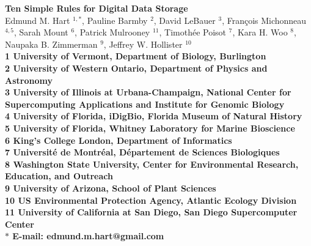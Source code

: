 \documentclass[10pt,letterpaper]{article}
\date{}
\begin{document}
\vspace*{0.35in}


\begin{flushleft}
{\Large
\textbf{Ten Simple Rules for Digital Data Storage}
}
\newline
\\
Edmund M. Hart $^{1 ,\ast}$,
Pauline Barmby $^{2 }$,
David LeBauer $^{3 }$,
François Michonneau $^{4,5 }$,
Sarah Mount $^{6 }$,
Patrick Mulrooney $^{11 }$,
Timothée Poisot $^{7 }$,
Kara H. Woo $^{8 }$,
Naupaka B. Zimmerman $^{9 }$,
Jeffrey W. Hollister $^{10 }$\\
\bigskip
\bf{1} University of Vermont, Department of Biology, Burlington
\\
\bf{2} University of Western Ontario, Department of Physics and Astronomy
\\
\bf{3} University of Illinois at Urbana-Champaign, National Center for Supercomputing Applications and Institute for
Genomic Biology
\\
\bf{4} University of Florida, iDigBio, Florida Museum of Natural History
\\
\bf{5} University of Florida, Whitney Laboratory for Marine Bioscience
\\
\bf{6} King's College London, Department of Informatics
\\
\bf{7} Université de Montréal, Département de Sciences Biologiques
\\
\bf{8} Washington State University, Center for Environmental Research, Education, and Outreach
\\
\bf{9} University of Arizona, School of Plant Sciences
\\
\bf{10} US Environmental Protection Agency, Atlantic Ecology Division
\\
\bf{11} University of California at San Diego, San Diego Supercomputer Center
\\
\bigskip
 $\ast$ E-mail: edmund.m.hart@gmail.com 










\end{flushleft}

\linenumbers
\end{document}
